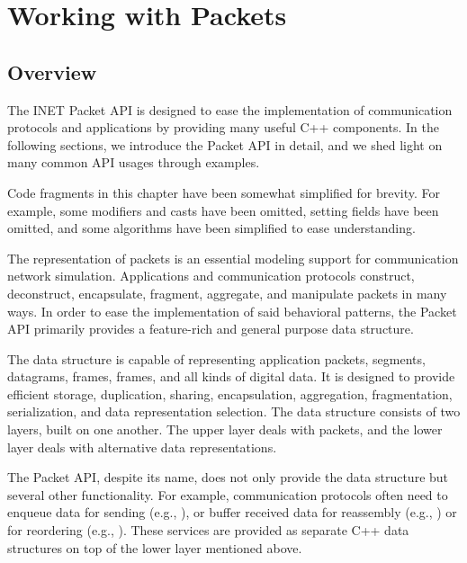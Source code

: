 \chapter{Working with Packets}
\label{cha:packet-api}

\section{Overview}
\label{sec:packets:overviews}

The INET Packet API is designed to ease the implementation of communication
protocols and applications by providing many useful C++ components. In the
following sections, we introduce the Packet API in detail, and we shed light on
many common API usages through examples.

\begin{note}
Code fragments in this chapter have been somewhat simplified for brevity. For
example, some  modifiers and  casts have been omitted,
setting fields have been omitted, and some algorithms have been simplified to
ease understanding.
\end{note}

The representation of packets is an essential modeling support for communication
network simulation. Applications and communication protocols construct,
deconstruct, encapsulate, fragment, aggregate, and manipulate packets in many
ways. In order to ease the implementation of said behavioral patterns, the
Packet API primarily provides a feature-rich and general purpose
 data structure.

The  data structure is capable of representing application
packets,  segments,  datagrams, 
frames,  frames, and all kinds of digital data. It is
designed to provide efficient storage, duplication, sharing, encapsulation,
aggregation, fragmentation, serialization, and data representation selection.
The  data structure consists of two layers, built on one
another. The upper layer deals with packets, and the lower layer deals with
alternative data representations.

The Packet API, despite its name, does not only provide the 
data structure but several other functionality. For example, communication
protocols often need to enqueue data for sending (e.g., ), or
buffer received data for reassembly (e.g., ) or for reordering
(e.g., ). These services are provided as separate C++ data
structures on top of the lower layer mentioned above.

